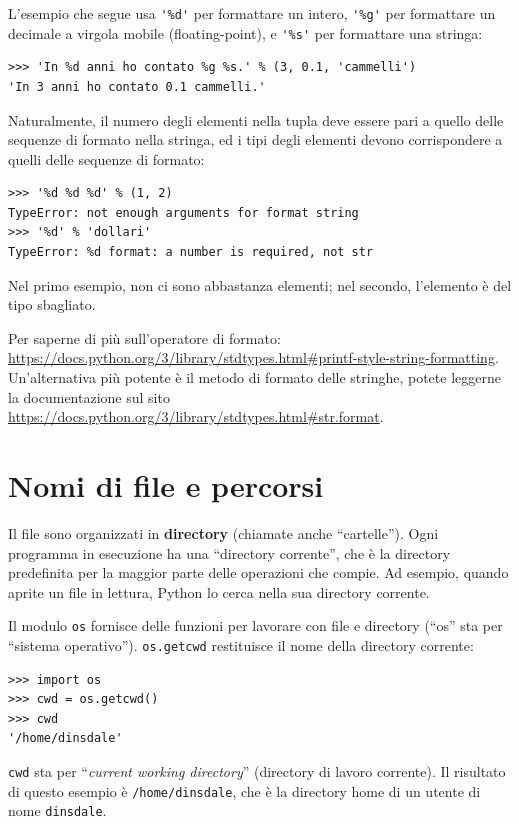\documentclass[10pt]{book}
\begin{document}
L'esempio che segue usa \verb"'%d'" per formattare un intero,
\verb"'%g'" per formattare un decimale a virgola mobile (floating-point), e \verb"'%s'" per formattare una stringa:

\begin{verbatim}
>>> 'In %d anni ho contato %g %s.' % (3, 0.1, 'cammelli')
'In 3 anni ho contato 0.1 cammelli.'
\end{verbatim}
%
Naturalmente, il numero degli elementi nella tupla deve essere pari a quello delle sequenze di formato nella stringa, ed i tipi degli elementi devono corrispondere a quelli delle sequenze di formato:

\begin{verbatim}
>>> '%d %d %d' % (1, 2)
TypeError: not enough arguments for format string
>>> '%d' % 'dollari'
TypeError: %d format: a number is required, not str
\end{verbatim}
%
Nel primo esempio, non ci sono abbastanza elementi; nel secondo, l'elemento è del tipo sbagliato.

Per saperne di più sull'operatore di formato: 
\url{https://docs.python.org/3/library/stdtypes.html#printf-style-string-formatting}. Un'alternativa più potente è il metodo di formato delle stringhe, potete leggerne la documentazione sul sito 
\url{https://docs.python.org/3/library/stdtypes.html#str.format}.


\section{Nomi di file e percorsi}
\label{paths}

Il file sono organizzati in {\bf directory} (chiamate anche ``cartelle'').
Ogni programma in esecuzione ha una ``directory corrente'', che è la directory predefinita per la maggior parte delle operazioni che compie.
Ad esempio, quando aprite un file in lettura, Python lo cerca nella sua directory corrente.

Il modulo {\tt os} fornisce delle funzioni per lavorare con file e directory (``os'' sta per ``sistema operativo'').  {\tt os.getcwd} restituisce il nome della directory corrente:

\begin{verbatim}
>>> import os
>>> cwd = os.getcwd()
>>> cwd
'/home/dinsdale'
\end{verbatim}
%
{\tt cwd} sta per ``{\em current working directory}'' (directory di lavoro corrente). 
Il risultato di questo esempio è {\tt /home/dinsdale}, che è la directory home di un utente di nome {\tt dinsdale}.
\end{document}
